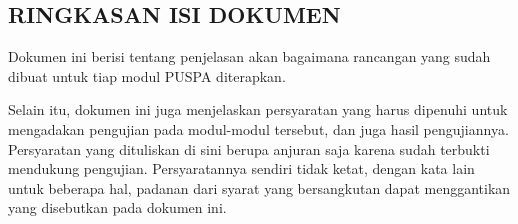 \subsection*{\textcolor{subsectioncolor}{\textsf{RINGKASAN ISI DOKUMEN}}}

Dokumen ini berisi tentang penjelasan akan bagaimana rancangan yang sudah dibuat untuk tiap modul PUSPA diterapkan.

Selain itu, dokumen ini juga menjelaskan persyaratan yang harus dipenuhi untuk mengadakan pengujian pada modul-modul tersebut, dan juga hasil pengujiannya.
Persyaratan yang dituliskan di sini berupa anjuran saja karena sudah terbukti mendukung pengujian.
Persyaratannya sendiri tidak ketat, dengan kata lain untuk beberapa hal, padanan dari syarat yang bersangkutan dapat menggantikan yang disebutkan pada dokumen ini.
